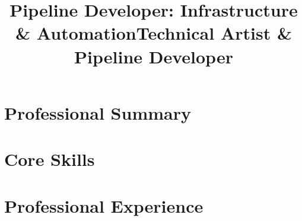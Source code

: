 \documentclass[10pt,a4paper,sans]{moderncv}
\title{Pipeline Developer: Infrastructure \& Automation}
\title{Technical Artist \& Pipeline Developer}
\newif\ifIT
\newif\ifTechArt
\begin{document}
\makecvtitle

\section{Professional Summary}
\ifIT
	\cvitem{}{Pipeline and infrastructure developer for an architectural visualization studio: Python automation, render-farm deployment, and Windows administration. Focused on reliable, unattended automation: silent software deployment, scheduled-task orchestration, and git-based release workflows, alongside Microsoft 365/Azure administration. Background in technical art; shipped SMITE 2 at Hi-Rez Studios.}
\fi
\ifTechArt
	\cvitem{}{Technical artist and pipeline developer who shipped \textbf{SMITE 2} at Hi-Rez Studios: character rigging plus the Python/MaxScript tooling behind the asset pipeline, with contract technical-art work in Unreal Engine 5. Now building production infrastructure for an architectural visualization studio (PyQt desktop tooling, render-farm automation, cross-DCC workflows), so tools stay grounded in how artists actually think and work. Uses AI-assisted development to build and iterate production tools faster.}
\fi

\section{Core Skills}
\ifIT
	\cvitem{Infrastructure}{Windows \& Linux administration; Microsoft 365 \& Azure; user/device management; remote access}
	\cvitem{Automation}{Python, Bash, PowerShell; silent software deployment; scheduled-task orchestration; batch processing}
	\cvitem{Render Farm}{Deployment and submission automation for 3ds Max render farms}
	\cvitem{Tools}{Git, Perforce, Jira, Confluence, PyQt}
\fi

\ifTechArt
	\cvitem{Programming}{Python (Maya API, PyMEL, PyQt/PySide, pymxs), MaxScript, MEL, Bash, Git, Perforce}
	\cvitem{DCC/Engines}{3ds Max, Maya, Unreal Engine 5, Unity, Substance Painter}
	\cvitem{Focus}{Character rigging, pipeline development, asset and scene optimization, render-farm automation, AI-assisted tool development}
\fi

\section{Professional Experience}
\end{document}
